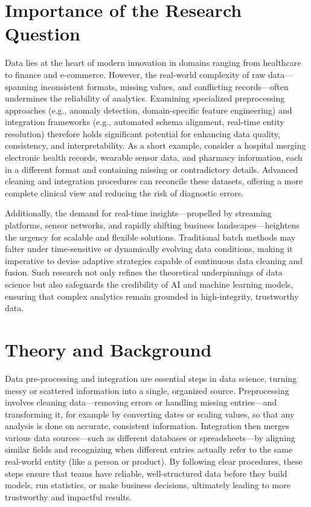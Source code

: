 \documentclass[12pt]{article}
\begin{document}
\section{Importance of the Research Question}
Data lies at the heart of modern innovation in domains ranging from healthcare to finance and e-commerce. However, the real-world complexity of raw data—spanning inconsistent formats, missing values, and conflicting records—often undermines the reliability of analytics. Examining specialized preprocessing approaches (e.g., anomaly detection, domain-specific feature engineering) and integration frameworks (e.g., automated schema alignment, real-time entity resolution) therefore holds significant potential for enhancing data quality, consistency, and interpretability. As a short example, consider a hospital merging electronic health records, wearable sensor data, and pharmacy information, each in a different format and containing missing or contradictory details. Advanced cleaning and integration procedures can reconcile these datasets, offering a more complete clinical view and reducing the risk of diagnostic errors.

Additionally, the demand for real-time insights—propelled by streaming platforms, sensor networks, and rapidly shifting business landscapes—heightens the urgency for scalable and flexible solutions. Traditional batch methods may falter under time-sensitive or dynamically evolving data conditions, making it imperative to devise adaptive strategies capable of continuous data cleaning and fusion. Such research not only refines the theoretical underpinnings of data science but also safeguards the credibility of AI and machine learning models, ensuring that complex analytics remain grounded in high-integrity, trustworthy data.

\section{Theory and Background}
Data pre-processing and integration are essential steps in data science, turning messy or scattered information into a single, organized source. Preprocessing involves cleaning data—removing errors or handling missing entries—and transforming it, for example by converting dates or scaling values, so that any analysis is done on accurate, consistent information. Integration then merges various data sources—such as different databases or spreadsheets—by aligning similar fields and recognizing when different entries actually refer to the same real-world entity (like a person or product). By following clear procedures, these steps ensure that teams have reliable, well-structured data before they build models, run statistics, or make business decisions, ultimately leading to more trustworthy and impactful results.
\end{document}
